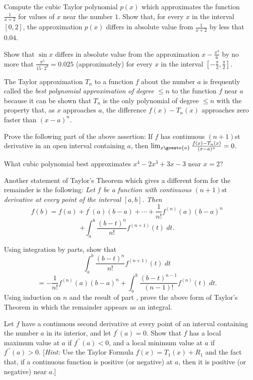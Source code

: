 \begin{exercises}
\begin{exenum}
\x
Compute the cubic Taylor polynomial $p(x)$
which approximates the function $\frac1{x+2}$
for values of $x$ near the number $1$.
\x
Show that, for every $x$ in the interval
$[0,2]$, the approximation $p(x)$ differs
in absolute value from $\frac1{x+2}$
by less that $0.04$.
\end{exenum}

Show that $\sin x$ differs in absolute value
from the approximation $x - \frac{x^3}6$
by no more that $\frac{\pi^5}{15\cdot2^8}
= 0.025$ (approximately) for every $x$ in the interval
$\left[ -\frac{\pi}2, \frac{\pi}2 \right]$.

The Taylor approximation $T_n$ to a function $f$
about the number $a$ is frequently called the
\emph{best polynomial approximation
of degree $\leq n$} to the function $f$ near $a$
because it can be shown that $T_n$ is the
only polynomial of degree $\leq n$ with the property
that, as $x$ approaches $a$, the difference
$f(x) - T_n(x)$ approaches zero
faster than $(x-a)^n$.

Prove the following part of the above assertion:
If $f$ has continuous $(n+1)$st derivative
in an open interval containing $a$, then
$\lim_{x\goesto{a}} \frac{f(x)-T_n(x)}
{(x-a)^n} = 0$.

What cubic polynomial best approximates
$x^4-2x^3+3x-3$ near $x=2$?

Another statement of Taylor's Theorem which
gives a different form for the remainder
is the following:
\emph{Let $f$ be a function with continuous
$(n+1)\mathrm{st}$ derivative at every point
of the interval $[a,b]$.  Then
\[
f(b) = f(a) + f^\prime(a)(b-a) + \cdots +
\frac1{n!} f^{(n)} (a)(b-a)^n
\]
\[
+ \int_a^b \frac{(b-t)^n}{n!} f^{(n+1)}
(t) \; dt
.
\]}
\begin{exenum}
\x
{}
Using integration by parts, show that
\[
\int_a^b \frac{(b-t)^n}{n!} f^{(n+1)} (t) \; dt
\]
\[
= - \frac1{n!} f^{(n)} (a)(b-a)^n +
\int_a^b \frac{(b-t)^{n-1}}{(n-1)!}
f^{(n)} (t) \; dt
.
\]
\x
Using induction on $n$ and the result of part
, prove the above form of
Taylor's Theorem in which the remainder
appears as an integral.
\end{exenum}

Let $f$ have a continuous second derivative
at every point of an interval containing the
number $a$ in its interior, and let
$f^\prime(a) = 0$.
Show that $f$ has a local maximum value
at $a$ if $f^{\prime\prime} (a) < 0$, and a
local minimum value at $a$ if $f^{\prime\prime}
(a) > 0$.
[\emph{Hint:} Use the Taylor Formula
$f(x) = T_1(x) + R_1$ and the fact that,
if a continuous function is positive (or negative)
at $a$, then it is positive (or negative) near $a$.]

\end{exercises}
